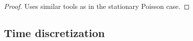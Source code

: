 \begin{theorem}
	
\end{theorem}

\begin{proof}
	Uses similar tools as in the stationary Poisson case.
\end{proof}

\begin{remark}
	
\end{remark}


\subsection{Time discretization}

\begin{remark}
	
\end{remark}

\begin{example}
	
\end{example}